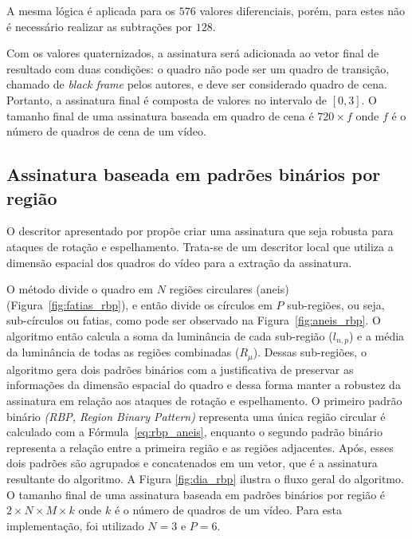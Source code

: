 A mesma lógica é aplicada para os $576$ valores diferenciais, porém, para estes não é necessário realizar as subtrações por $128$.

Com os valores quaternizados, a assinatura será adicionada ao vetor final de resultado com duas condições: o quadro não pode ser um quadro de transição, chamado de \textit{black frame} pelos autores, e deve ser considerado quadro de cena. Portanto, a assinatura final é composta de valores no intervalo de $\left[0,3\right]$. O tamanho final de uma assinatura baseada em quadro de cena é $720 \times f$ onde $f$ é o número de quadros de cena de um vídeo.

%
\subsection{Assinatura baseada em padrões binários por região}


O descritor apresentado por  propõe criar uma assinatura que seja robusta para ataques de rotação e espelhamento. Trata-se de um descritor local que utiliza a dimensão espacial dos quadros do vídeo para a extração da assinatura. 


O método divide o quadro em $N$ regiões circulares (aneis) (Figura~\ref{fig:fatias_rbp}), e então divide os círculos em $P$ sub-regiões, ou seja, sub-círculos ou fatias, como pode ser observado na Figura~\ref{fig:aneis_rbp}. O algoritmo então calcula a soma da luminância de cada sub-região ($l_{n,p}$) e a média da luminância de todas as regiões combinadas ($R_\mu$). Dessas sub-regiões, o algoritmo gera dois padrões binários com a justificativa de preservar as informações da dimensão espacial do quadro e dessa forma manter a robustez da assinatura em relação aos ataques de rotação e espelhamento. O  primeiro padrão binário  \textit{(RBP, Region Binary Pattern)} representa uma única região circular é calculado com a Fórmula~\ref{eq:rbp_aneis}, enquanto o segundo padrão binário representa a relação entre a primeira região e as regiões adjacentes. Após, esses dois padrões são agrupados e concatenados em um vetor, que é a assinatura resultante do algoritmo. A Figura \ref{fig:dia_rbp} ilustra o fluxo geral do algoritmo. O tamanho final de uma assinatura baseada em padrões binários por região é $2 \times N \times M \times k$ onde $k$ é o número de quadros de um vídeo. Para esta implementação, foi utilizado $N = 3$ e $P = 6$.

